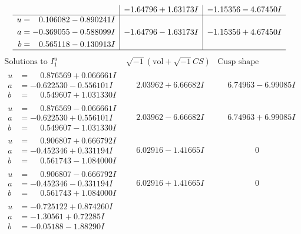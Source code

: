 \documentclass[1p]{elsarticle_modified}
\theoremstyle{definition}
\newcommand{\I}{\sqrt{-1}}
\begin{document}
$$\begin{array}{c|c|c}
 & -1.64796 + 1.63173 I & -1.15356 - 4.67450 I \\ \hline\begin{aligned}
u &= \phantom{-}0.106082 - 0.890241 I \\
a &= -0.369055 - 0.588099 I \\
b &= \phantom{-}0.565118 - 0.130913 I\end{aligned}
 & -1.64796 - 1.63173 I & -1.15356 + 4.67450 I\\
 \hline 
 \end{array}$$\newpage$$\begin{array}{c|c|c}  
\text{Solutions to }I^u_{1}& \I (\text{vol} + \sqrt{-1}CS) & \text{Cusp shape}\\
 \hline 
\begin{aligned}
u &= \phantom{-}0.876569 + 0.066661 I \\
a &= -0.622530 - 0.556101 I \\
b &= \phantom{-}0.549607 + 1.031330 I\end{aligned}
 & \phantom{-}2.03962 + 6.66682 I & \phantom{-}6.74963 - 6.99085 I \\ \hline\begin{aligned}
u &= \phantom{-}0.876569 - 0.066661 I \\
a &= -0.622530 + 0.556101 I \\
b &= \phantom{-}0.549607 - 1.031330 I\end{aligned}
 & \phantom{-}2.03962 - 6.66682 I & \phantom{-}6.74963 + 6.99085 I \\ \hline\begin{aligned}
u &= \phantom{-}0.906807 + 0.666792 I \\
a &= -0.452346 + 0.331194 I \\
b &= \phantom{-}0.561743 - 1.084000 I\end{aligned}
 & \phantom{-}6.02916 - 1.41665 I & \phantom{-0.000000 } 0 \\ \hline\begin{aligned}
u &= \phantom{-}0.906807 - 0.666792 I \\
a &= -0.452346 - 0.331194 I \\
b &= \phantom{-}0.561743 + 1.084000 I\end{aligned}
 & \phantom{-}6.02916 + 1.41665 I & \phantom{-0.000000 } 0 \\ \hline\begin{aligned}
u &= -0.725122 + 0.874260 I \\
a &= -1.30561 + 0.72285 I \\
b &= -0.05188 - 1.88290 I\end{aligned}

\end{array}$$
\end{document}
